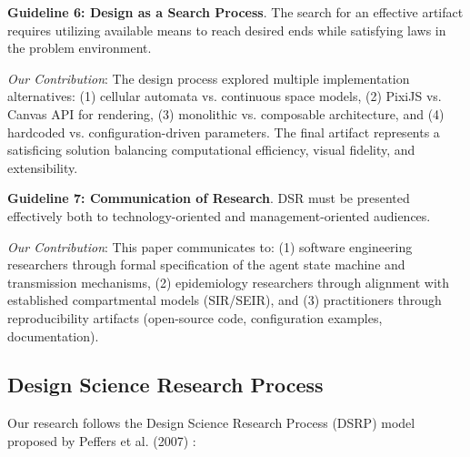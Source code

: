 \textbf{Guideline 6: Design as a Search Process}. The search for an effective artifact requires utilizing available means to reach desired ends while satisfying laws in the problem environment.

\emph{Our Contribution}: The design process explored multiple implementation alternatives: (1) cellular automata vs. continuous space models, (2) PixiJS vs. Canvas API for rendering, (3) monolithic vs. composable architecture, and (4) hardcoded vs. configuration-driven parameters. The final artifact represents a satisficing solution balancing computational efficiency, visual fidelity, and extensibility.

\textbf{Guideline 7: Communication of Research}. DSR must be presented effectively both to technology-oriented and management-oriented audiences.

\emph{Our Contribution}: This paper communicates to: (1) software engineering researchers through formal specification of the agent state machine and transmission mechanisms, (2) epidemiology researchers through alignment with established compartmental models (SIR/SEIR), and (3) practitioners through reproducibility artifacts (open-source code, configuration examples, documentation).

\subsection{Design Science Research Process}

Our research follows the Design Science Research Process (DSRP) model proposed by Peffers et al. (2007) \cite{peffers2007design}:

